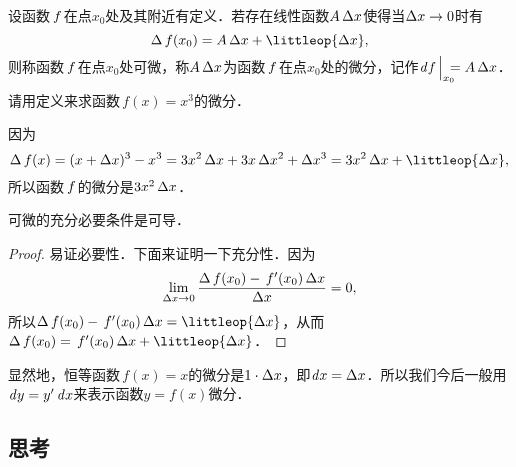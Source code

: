 \begin{definition*}
  \label{defn:diff}
  设函数\(\,f\mkern2mu\)在点\(x_0\)处及其附近有定义．若存在线性函数\(A \mathop{}\!\Delta x\)使得当\(\mathop{}\!\Delta x \to 0\)时有
  \begin{equation*}
    \fwdf\,f(x_0) = A \fdx + \littleop{\fdx},
  \end{equation*}
  则称函数\(\,f\mkern2mu\)在点\(x_0\)处可微，称\(A \mathop{}\!\Delta x\)为函数\(\,f\mkern2mu\)在点\(x_0\)处的微分，记作\(\diff f\,\smash{\Big\vert_{\mathrlap{x_0}}\,} = A \fdx\)．
\end{definition*}

\begin{example*}
  请用定义来求函数\(\,f(x) = x^3\)的微分．

  \begin{remark}
    因为
    \begin{equation*}
      \fwdf\,f(x)
      = (x+\fdx)^3 - x^3
      = 3x^2 \fdx + 3x \fdx^2 + \fdx^3
      = 3x^2 \fdx + \littleop{\fdx},
    \end{equation*}
    所以函数\(\,f\mkern2mu\)的微分是\(3x^2 \mathop{}\!\Delta x\)．
  \end{remark}
\end{example*}

\begin{theorem}
  \label{thm:diffequivderiv}
  可微的充分必要条件是可导．

  \begin{proof}
    易证必要性．下面来证明一下充分性．因为
    \begin{equation*}
      \lim_{\mathop{}\!\Delta x \to 0} \frac{\mathop{}\!\Delta\,f(x_0) - \,f'(x_0) \mathop{}\!\Delta x}{\mathop{}\!\Delta x} = 0,
    \end{equation*}
    所以\(\fwdf\,f(x_0) - \,f'(x_0) \fdx = \littleop{\fdx}\)，从而\(\fwdf\,f(x_0) = \,f'(x_0) \fdx + \littleop{\fdx}\)．
  \end{proof}
\end{theorem}

\begin{remark}
  显然地，恒等函数\(\,f(x) = x\)的微分是\(1 \cdot \mathop{}\!\Delta x\)，即\(\mathop{}\!\mathit{d} x = \mathop{}\!\Delta x\)．所以我们今后一般用\(\mathop{}\!\mathit{d} y = y' \mathop{}\!\mathit{d} x\)来表示函数\(y = f(x)\)微分．
\end{remark}


\subsection*{思考}

